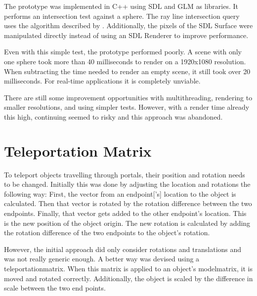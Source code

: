 The prototype was implemented in C++ using SDL \cite{sdl} and GLM \cite{glm} as libraries. It performs an intersection test against a sphere. The ray line intersection query uses the algorithm described by \textcite{eberly:2006:3d}. Additionally, the pixels of the SDL Surface were manipulated directly instead of using an SDL Renderer to improve performance.

Even with this simple test, the prototype performed poorly. A scene with only one sphere took more than 40 milliseconds to render on a 1920x1080 resolution. When subtracting the time needed to render an empty scene, it still took over 20 milliseconds. For real-time applications it is completely unviable.

There are still some improvement opportunities with multithreading, rendering to smaller resolutions, and using simpler tests. However, with a render time already this high, continuing seemed to risky and this approach was abandoned.








\section{Teleportation Matrix}
\label{section:teleportationmatrix}
To teleport objects travelling through portals, their position and rotation needs to be changed. Initially this was done by adjusting the location and rotations the following way: First, the vector from an \gls{endpoint}['s] location to the object is calculated. Then that vector is rotated by the rotation difference between the two endpoints. Finally, that vector gets added to the other endpoint's location. This is the new position of the object origin. The new rotation is calculated by adding the rotation difference of the two endpoints to the object's rotation.

However, the initial approach did only consider rotations and translations and was not really generic enough. A better way was devised using a \gls{teleportationmatrix}. When this matrix is applied to an object's \gls{modelmatrix}, it is moved and rotated correctly. Additionally, the object is scaled by the difference in scale between the two end points.




